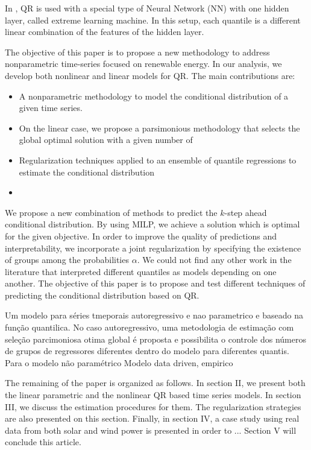 In \cite{wan_direct_2017}, QR is used with a special type of Neural Network (NN) with one hidden layer, called extreme learning machine. In this setup, each quantile is a different linear combination of the features of the hidden layer. 


 



The objective of this paper is to propose a new methodology to address nonparametric time-series focused on renewable energy. In our analysis, we develop both nonlinear and linear models for QR. The main contributions are:
\begin{itemize}
	\item A nonparametric methodology to model the conditional distribution of a given time series.
	
	\item On the linear case, we propose a parsimonious methodology that selects the global optimal solution with a given number of 
	
	\item Regularization techniques applied to an ensemble of quantile regressions to estimate the conditional distribution
	
	\item 
	
\end{itemize}

We propose a new combination of methods to predict the $k$-step ahead conditional distribution. By using MILP, we achieve a solution which is optimal for the given objective. In order to improve the quality of predictions and interpretability, we incorporate a joint regularization by specifying the existence of groups among the probabilities $\alpha$. We could not find any other work in the literature that interpreted different quantiles as models depending on one another. 
The objective of this paper is to propose and test different techniques of predicting the conditional distribution based on QR. 


Um modelo para séries tmeporais autoregressivo e nao parametrico e baseado na função quantilica. No caso autoregressivo, uma metodologia de estimação com seleção parcimoniosa otima global é proposta e possibilita o controle dos números de grupos de regressores diferentes dentro do modelo para diferentes quantis. Para o modelo não paramétrico
Modelo data driven, empirico



The remaining of the paper is organized as follows. In section II, we present both the linear parametric and the nonlinear QR based time series models. In section III, we discuss the estimation procedures for them. The regularization strategies are also presented on this section. Finally, in section IV, a case study using real data from both solar and wind power is presented in order to ...
Section V will conclude this article.



